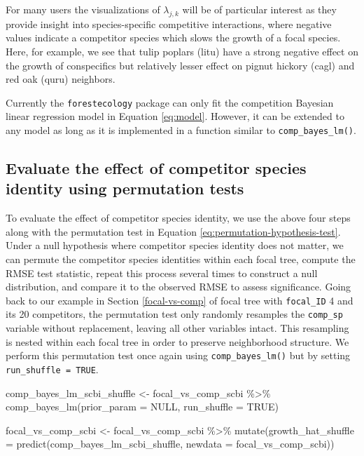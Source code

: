 \documentclass[12pt]{article}
\newenvironment{Shaded}{\begin{snugshade}}{\end{snugshade}}
\newcommand{\AttributeTok}[1]{\textcolor[rgb]{0.77,0.63,0.00}{#1}}
\newcommand{\ConstantTok}[1]{\textcolor[rgb]{0.00,0.00,0.00}{#1}}
\newcommand{\FunctionTok}[1]{\textcolor[rgb]{0.00,0.00,0.00}{#1}}
\newcommand{\NormalTok}[1]{#1}
\newcommand{\OtherTok}[1]{\textcolor[rgb]{0.56,0.35,0.01}{#1}}
\newcommand{\SpecialCharTok}[1]{\textcolor[rgb]{0.00,0.00,0.00}{#1}}
\begin{document}
For many users the visualizations of \(\lambda_{j,k}\) will be of
particular interest as they provide insight into species-specific
competitive interactions, where negative values indicate a competitor
species which slows the growth of a focal species. Here, for example, we
see that tulip poplars (litu) have a strong negative effect on the
growth of conspecifics but relatively lesser effect on pignut hickory
(cagl) and red oak (quru) neighbors.

Currently the \texttt{forestecology} package can only fit the
competition Bayesian linear regression model in Equation \ref{eq:model}.
However, it can be extended to any model as long as it is implemented in
a function similar to \texttt{comp\_bayes\_lm()}.

\hypertarget{permutation-test}{%
\subsection{Evaluate the effect of competitor species identity using
permutation tests}\label{permutation-test}}

To evaluate the effect of competitor species identity, we use the above
four steps along with the permutation test in Equation
\ref{eq:permutation-hypothesis-test}. Under a null hypothesis where
competitor species identity does not matter, we can permute the
competitor species identities within each focal tree, compute the RMSE
test statistic, repeat this process several times to construct a null
distribution, and compare it to the observed RMSE to assess
significance. Going back to our example in Section \ref{focal-vs-comp}
of focal tree with \texttt{focal\_ID} 4 and its 20 competitors, the
permutation test only randomly resamples the \texttt{comp\_sp} variable
without replacement, leaving all other variables intact. This resampling
is nested within each focal tree in order to preserve neighborhood
structure. We perform this permutation test once again using
\texttt{comp\_bayes\_lm()} but by setting
\texttt{run\_shuffle\ =\ TRUE}.

\begin{Shaded}
\begin{Highlighting}[]
\NormalTok{comp\_bayes\_lm\_scbi\_shuffle }\OtherTok{\textless{}{-}}\NormalTok{ focal\_vs\_comp\_scbi }\SpecialCharTok{\%\textgreater{}\%}
    \FunctionTok{comp\_bayes\_lm}\NormalTok{(}\AttributeTok{prior\_param =} \ConstantTok{NULL}\NormalTok{, }\AttributeTok{run\_shuffle =} \ConstantTok{TRUE}\NormalTok{)}

\NormalTok{focal\_vs\_comp\_scbi }\OtherTok{\textless{}{-}}\NormalTok{ focal\_vs\_comp\_scbi }\SpecialCharTok{\%\textgreater{}\%}
    \FunctionTok{mutate}\NormalTok{(}\AttributeTok{growth\_hat\_shuffle =} \FunctionTok{predict}\NormalTok{(comp\_bayes\_lm\_scbi\_shuffle, }\AttributeTok{newdata =}\NormalTok{ focal\_vs\_comp\_scbi))}
\end{Highlighting}
\end{Shaded}
\end{document}
